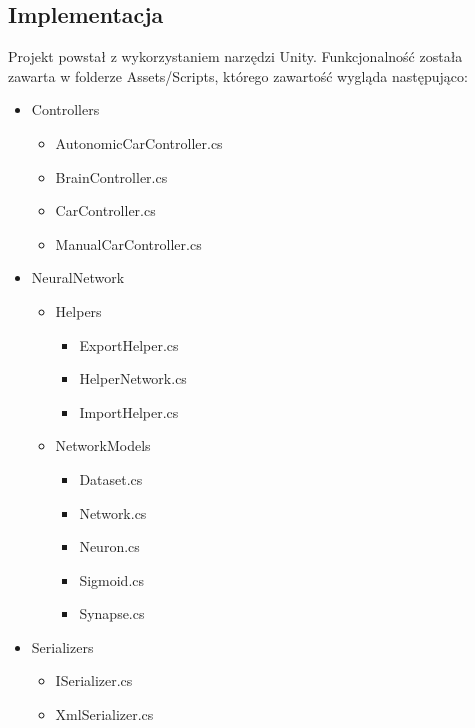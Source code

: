 \documentclass[12pt,a4paper]{article}
\begin{document}
	\subsection*{Implementacja}
	Projekt powstał z wykorzystaniem narzędzi Unity. Funkcjonalność została zawarta w folderze Assets/Scripts, którego zawartość wygląda następująco:
	\begin{itemize}
	\item Controllers 
		\begin{itemize}
		\item AutonomicCarController.cs
		\item BrainController.cs
		\item CarController.cs
		\item ManualCarController.cs
		\end{itemize}
	\item NeuralNetwork
		\begin{itemize}
		\item Helpers
			\begin{itemize}
			\item ExportHelper.cs
			\item HelperNetwork.cs
			\item ImportHelper.cs
			\end{itemize}
		\item NetworkModels
			\begin{itemize}
			\item Dataset.cs
			\item Network.cs
			\item Neuron.cs
			\item Sigmoid.cs
			\item Synapse.cs
			\end{itemize}
		\end{itemize}
	\item Serializers
		\begin{itemize}
		\item ISerializer.cs
		\item XmlSerializer.cs
		\end{itemize}
	\end{itemize}
	
\end{document}
